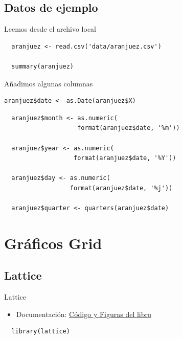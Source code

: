 \documentclass[xcolor={usenames,svgnames,dvipsnames}]{beamer}
\begin{document}
\subsection{Datos de ejemplo}
\label{sec-1-2}
\begin{frame}[fragile,label=sec-1-2-1]{Leemos desde el archivo local}
 \lstset{language=R,label= ,caption= ,numbers=none}
\begin{lstlisting}
  aranjuez <- read.csv('data/aranjuez.csv')

  summary(aranjuez)
\end{lstlisting}
\end{frame}

\begin{frame}[fragile,label=sec-1-2-2]{Añadimos algunas columnas}
 \lstset{language=R,label= ,caption= ,numbers=none}
\begin{lstlisting}
aranjuez$date <- as.Date(aranjuez$X)
\end{lstlisting}
\lstset{language=R,label= ,caption= ,numbers=none}
\begin{lstlisting}
  aranjuez$month <- as.numeric(
                    format(aranjuez$date, '%m'))

  aranjuez$year <- as.numeric(
                   format(aranjuez$date, '%Y'))

  aranjuez$day <- as.numeric(
                  format(aranjuez$date, '%j'))

  aranjuez$quarter <- quarters(aranjuez$date)
\end{lstlisting}
\end{frame}

\section{Gráficos Grid}
\label{sec-2}

\subsection{Lattice}
\label{sec-2-1}

\begin{frame}[fragile,label=sec-2-1-1]{Lattice}
 \begin{itemize}
\item Documentación: \href{http://lmdvr.r-forge.r-project.org/figures/figures.html}{Código y Figuras del libro}
\end{itemize}

\lstset{language=R,label= ,caption= ,numbers=none}
\begin{lstlisting}
  library(lattice)
\end{lstlisting}
\end{frame}
\end{document}

